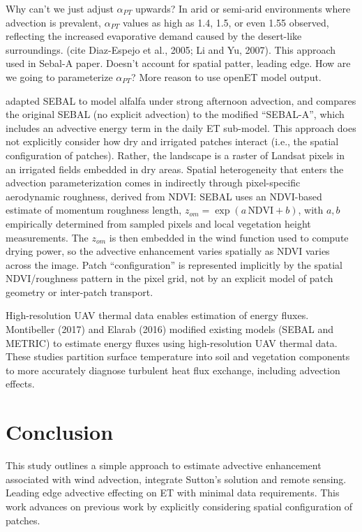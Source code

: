 \documentclass{article}
\begin{document}
    Why can't we just adjust $\alpha_{PT}$ upwards? 
     In arid or semi-arid environments where advection is prevalent, $\alpha_{PT}$ values as high as 1.4, 1.5, or even 1.55 observed, reflecting the increased evaporative demand caused by the desert-like surroundings. (cite Diaz-Espejo et al., 2005; Li and Yu, 2007).
    This approach used in Sebal-A paper.
    Doesn't account for spatial patter, leading edge. How are we going to parameterize $\alpha_{PT}$? More reason to use openET model output. 
    
    
    \citet{mkhwanazi2015sebal} adapted SEBAL to model alfalfa under strong afternoon advection, and  compares the original SEBAL (no explicit advection) to the modified ``SEBAL-A'', which includes an advective energy term  in the daily ET sub-model. 
    This approach does not explicitly consider how dry and irrigated patches interact (i.e., the spatial configuration of patches).  
    Rather, the landscape is a raster of Landsat pixels in an irrigated fields embedded in dry areas. 
    Spatial heterogeneity that  enters the advection parameterization comes in indirectly through pixel-specific aerodynamic roughness, derived from NDVI:  SEBAL uses an NDVI-based estimate of momentum roughness length, $z_{om} = \exp(a\,\text{NDVI} + b)$,  with $a, b$  empirically determined from sampled pixels and local vegetation height measurements. The $z_{om}$ is then embedded in the wind function used to compute drying power, so the advective enhancement varies spatially as NDVI varies across the image.
    Patch ``configuration'' is represented implicitly by the spatial NDVI/roughness pattern in the pixel grid, not by an explicit model of patch geometry or inter-patch transport.
    
    High-resolution UAV thermal data enables estimation of energy fluxes.
    Montibeller (2017) and Elarab (2016) modified existing models (SEBAL and METRIC) to estimate energy fluxes using high-resolution UAV thermal data. 
    These studies partition surface temperature into soil and vegetation components to more accurately diagnose turbulent heat flux exchange, including advection effects.
    
    
     
    
    \section{Conclusion}
    
    This study outlines a simple approach to estimate advective enhancement associated with wind advection, integrate Sutton's solution and remote sensing. 
    Leading edge advective effecting on ET with minimal data requirements.
    This work advances on previous work by explicitly considering spatial configuration of patches. 
    
\end{document}
